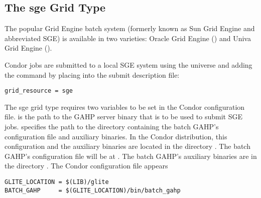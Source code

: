 
\subsection{\label{sec:SGE}The sge Grid Type }

The popular Grid Engine batch system (formerly known as Sun Grid Engine and
abbreviated SGE) is available in two varieties:
Oracle Grid Engine
()
and Univa Grid Engine
().

Condor jobs are submitted to a local SGE system
using the  universe and adding the
 command by placing
into the submit description file:
\begin{verbatim}
grid_resource = sge
\end{verbatim}

The sge grid type requires two variables to be set in the Condor
configuration file.
 is the path to the GAHP server binary that is to be
used to submit SGE jobs.
 specifies the path to the directory containing the 
batch GAHP's configuration file and auxiliary binaries.
In the Condor distribution, this configuration and the auxiliary binaries
are located in the directory .
The batch GAHP's configuration file will be at
.
The batch GAHP's auxiliary binaries
are in the directory .
The Condor configuration file appears

\footnotesize
\begin{verbatim}
GLITE_LOCATION = $(LIB)/glite
BATCH_GAHP     = $(GLITE_LOCATION)/bin/batch_gahp
\end{verbatim}
\normalsize

